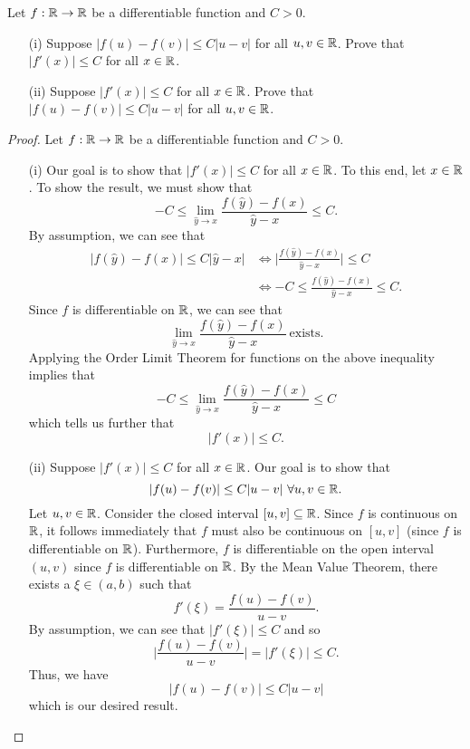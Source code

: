 \documentclass[a4paper]{article}
\begin{document}
\begin{problem}
    Let \( f: \mathbb{R} \to \mathbb{R}  \) be a differentiable function and \( C > 0  \).
    \begin{enumerate} 
        \item[(i)] Suppose \( | f(u) - f(v) | \leq C | u - v  |  \) for all \( u,v \in \mathbb{R}  \). Prove that \( | f'(x) | \leq C  \) for all \( x \in \mathbb{R}  \).
        \item[(ii)] Suppose \( | f'(x) | \leq C  \) for all \( x \in \mathbb{R}  \). Prove that \( | f(u) - f(v) |  \leq C | u -v  |  \) for all \( u,v \in \mathbb{R}  \).
    \end{enumerate}
\end{problem}
\begin{proof}
    Let \( f: \mathbb{R} \to \mathbb{R}  \) be a differentiable function and \( C > 0 \).
    \begin{enumerate}
        \item[(i)] Our goal is to show that \( | f'(x) | \leq C  \) for all \( x \in \mathbb{R}  \). To this end, let \( x \in \mathbb{R}  \). To show the result, we must show that  
            \[  -C \leq \lim_{ \hat{y} \to x  }  \frac{ f(\hat{y}) - f(x) }{  \hat{y} - x } \leq C. \tag{*}    \]
            By assumption, we can see that 
            \begin{align*}
            | f(\hat{y}) - f(x) | \leq C | \hat{y} - x  |  &\iff \Big| \frac{ f(\hat{y}) - f(x) }{  \hat{y} - x  }  \Big|  \leq C \\  
                                                           &\iff - C \leq \frac{ f(\hat{y}) - f(x) }{  \hat{y} - x  }  \leq C.
        \end{align*}
        Since \( f  \) is differentiable on \( \mathbb{R}  \), we can see that 
        \[  \lim_{ \hat{y} \to x  }  \frac{ f(\hat{y}) - f(x) }{ \hat{y} - x  } \ \text{exists}.  \]
        Applying the Order Limit Theorem for functions on the above inequality implies that 
        \[ - C \leq \lim_{ \hat{y} \to x  }  \frac{ f(\hat{y}) - f(x) }{ \hat{y} - x   } \leq C    \]
        which tells us further that
        \[  | f'(x)  |  \leq C.  \]
        \item[(ii)] Suppose \( | f'(x) | \leq C  \) for all \( x \in \mathbb{R}  \). Our goal is to show that          
            \[  | f(u) - f(v) |  \leq C | u - v  | \ \forall u,v \in \R.   \] 
            Let \( u,v \in \mathbb{R}  \). Consider the closed interval \( [u,v] \subseteq \mathbb{R}  \). Since \( f  \) is continuous on \( \mathbb{R}  \), it follows immediately that \( f  \) must also be continuous on \( [u,v] \) (since \( f  \) is differentiable on \( \mathbb{R}  \)). Furthermore, \( f  \) is differentiable on the open interval \( (u,v) \) since \( f  \) is differentiable on \( \mathbb{R}  \). By the Mean Value Theorem, there exists a \( \xi \in (a,b) \) such that 
            \[  f'(\xi) = \frac{ f(u) - f(v) }{ u - v  }. \]
            By assumption, we can see that \( | f'(\xi) | \leq C   \) and so 
            \[   \Big| \frac{ f(u) - f(v) }{ u - v  }    \Big| = | f'(\xi) | \leq C.  \]
            Thus, we have 
            \[  | f(u) - f(v) | \leq C | u - v |  \]
            which is our desired result.
    \end{enumerate}
\end{proof}
\end{document}
